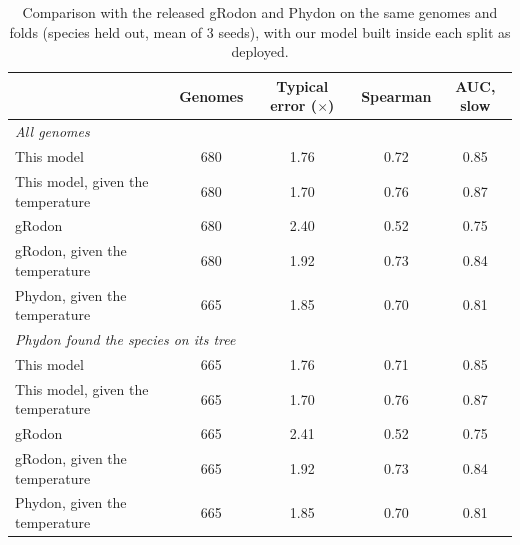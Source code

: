 \begin{table}[ht]\centering\small
\caption{Comparison with the released gRodon and Phydon on the same genomes and folds (species held out, mean of 3 seeds), with our model built inside each split as deployed.}\label{tab:released}
\begin{tabular}{lcccc}
\toprule
& Genomes & Typical error ($\times$) & Spearman & AUC, slow \\
\midrule
\multicolumn{5}{l}{\textit{All genomes}} \\
\quad This model & 680 & 1.76 & 0.72 & 0.85 \\
\quad This model, given the temperature & 680 & 1.70 & 0.76 & 0.87 \\
\quad gRodon & 680 & 2.40 & 0.52 & 0.75 \\
\quad gRodon, given the temperature & 680 & 1.92 & 0.73 & 0.84 \\
\quad Phydon, given the temperature & 665 & 1.85 & 0.70 & 0.81 \\
\multicolumn{5}{l}{\textit{Phydon found the species on its tree}} \\
\quad This model & 665 & 1.76 & 0.71 & 0.85 \\
\quad This model, given the temperature & 665 & 1.70 & 0.76 & 0.87 \\
\quad gRodon & 665 & 2.41 & 0.52 & 0.75 \\
\quad gRodon, given the temperature & 665 & 1.92 & 0.73 & 0.84 \\
\quad Phydon, given the temperature & 665 & 1.85 & 0.70 & 0.81 \\
\bottomrule
\end{tabular}
\end{table}
